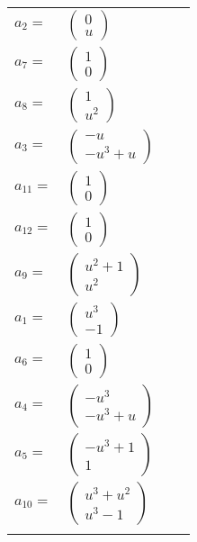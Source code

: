 \documentclass[1p]{elsarticle_modified}
\theoremstyle{definition}
\begin{document}
\begin{tabular}{m{7pt} m{180pt} m{7pt} m{180pt} }
\flushright $a_{2}=$&$\begin{pmatrix}0\\u\end{pmatrix}$ \\
\flushright $a_{7}=$&$\begin{pmatrix}1\\0\end{pmatrix}$ \\
\flushright $a_{8}=$&$\begin{pmatrix}1\\u^2\end{pmatrix}$ \\
\flushright $a_{3}=$&$\begin{pmatrix}- u\\- u^3+u\end{pmatrix}$ \\
\flushright $a_{11}=$&$\begin{pmatrix}1\\0\end{pmatrix}$ \\
\flushright $a_{12}=$&$\begin{pmatrix}1\\0\end{pmatrix}$ \\
\flushright $a_{9}=$&$\begin{pmatrix}u^2+1\\u^2\end{pmatrix}$ \\
\flushright $a_{1}=$&$\begin{pmatrix}u^3\\-1\end{pmatrix}$ \\
\flushright $a_{6}=$&$\begin{pmatrix}1\\0\end{pmatrix}$ \\
\flushright $a_{4}=$&$\begin{pmatrix}- u^3\\- u^3+u\end{pmatrix}$ \\
\flushright $a_{5}=$&$\begin{pmatrix}- u^3+1\\1\end{pmatrix}$ \\
\flushright $a_{10}=$&$\begin{pmatrix}u^3+u^2\\u^3-1\end{pmatrix}$\\&\end{tabular}
\end{document}
